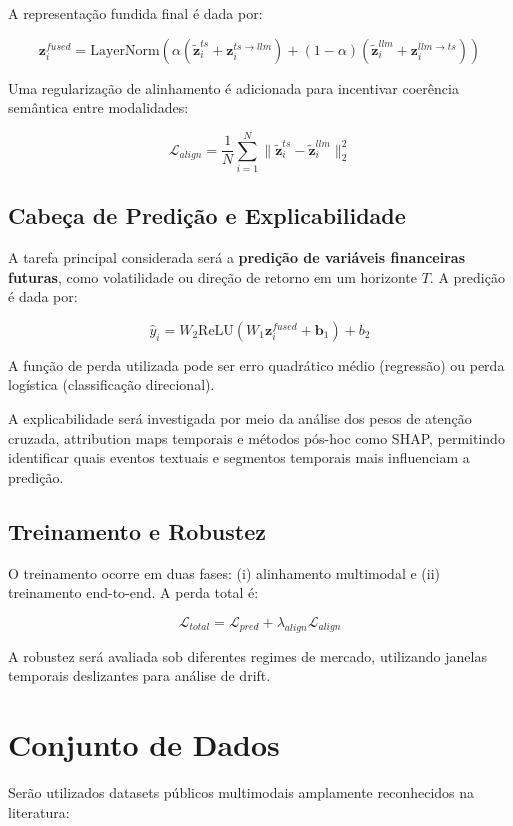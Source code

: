 \documentclass[11pt, a4paper]{article}
\begin{document}
A representação fundida final é dada por:

\[
\mathbf{z}_i^{fused} =
\text{LayerNorm}\left(
\alpha(\tilde{\mathbf{z}}_i^{ts} + \mathbf{z}_i^{ts \to llm}) +
(1-\alpha)(\tilde{\mathbf{z}}_i^{llm} + \mathbf{z}_i^{llm \to ts})
\right)
\]

Uma regularização de alinhamento é adicionada para incentivar coerência semântica entre modalidades:

\[
\mathcal{L}_{align} =
\frac{1}{N}\sum_{i=1}^{N}
\|\tilde{\mathbf{z}}_i^{ts} - \tilde{\mathbf{z}}_i^{llm}\|_2^2
\]

\subsection{Cabeça de Predição e Explicabilidade}

A tarefa principal considerada será a \textbf{predição de variáveis financeiras futuras}, como volatilidade ou direção de retorno em um horizonte $T$. A predição é dada por:

\[
\hat{y}_i = W_2 \text{ReLU}(W_1 \mathbf{z}_i^{fused} + \mathbf{b}_1) + b_2
\]

A função de perda utilizada pode ser erro quadrático médio (regressão) ou perda logística (classificação direcional).

A explicabilidade será investigada por meio da análise dos pesos de atenção cruzada, attribution maps temporais e métodos pós-hoc como SHAP, permitindo identificar quais eventos textuais e segmentos temporais mais influenciam a predição.

\subsection{Treinamento e Robustez}

O treinamento ocorre em duas fases: (i) alinhamento multimodal e (ii) treinamento end-to-end. A perda total é:

\[
\mathcal{L}_{total} = \mathcal{L}_{pred} + \lambda_{align}\mathcal{L}_{align}
\]

A robustez será avaliada sob diferentes regimes de mercado, utilizando janelas temporais deslizantes para análise de drift.

\section{Conjunto de Dados}

Serão utilizados datasets públicos multimodais amplamente reconhecidos na literatura:
\end{document}
